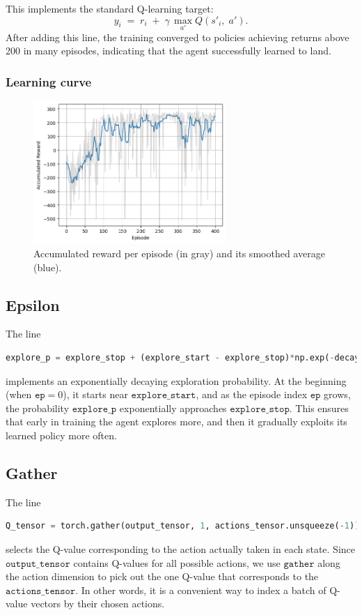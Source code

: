 This implements the standard Q-learning target:
\[
y_i \;=\; r_i \;+\; \gamma \,\max_{a'}Q(s'_i,\;a').
\]
After adding this line, the training converged to policies achieving returns above 200 in many episodes, indicating that the agent successfully learned to land.

\subsubsection*{Learning curve}
\begin{figure}[H]
  \centering
  \includegraphics[width=0.65\textwidth]{Code/output.png}
  \caption{Accumulated reward per episode (in gray) and its smoothed average (blue).}
\end{figure}

\subsection{Epsilon}
The line
\begin{lstlisting}[language=Python]
    explore_p = explore_stop + (explore_start - explore_stop)*np.exp(-decay_rate*ep)
\end{lstlisting}
implements an exponentially decaying exploration probability. At the beginning (when \(\texttt{ep} = 0\)), it starts near \(\texttt{explore\_start}\), and as the episode index \(\texttt{ep}\) grows, the probability \(\texttt{explore\_p}\) exponentially approaches \(\texttt{explore\_stop}\). This ensures that early in training the agent explores more, and then it gradually exploits its learned policy more often.

\subsection{Gather}
The line
\begin{lstlisting}[language=Python]
    Q_tensor = torch.gather(output_tensor, 1, actions_tensor.unsqueeze(-1)).squeeze()
\end{lstlisting}
selects the Q-value corresponding to the action actually taken in each state. Since \(\texttt{output\_tensor}\) contains Q-values for all possible actions, we use \(\texttt{gather}\) along the action dimension to pick out the one Q-value that corresponds to the \(\texttt{actions\_tensor}\). In other words, it is a convenient way to index a batch of Q-value vectors by their chosen actions.